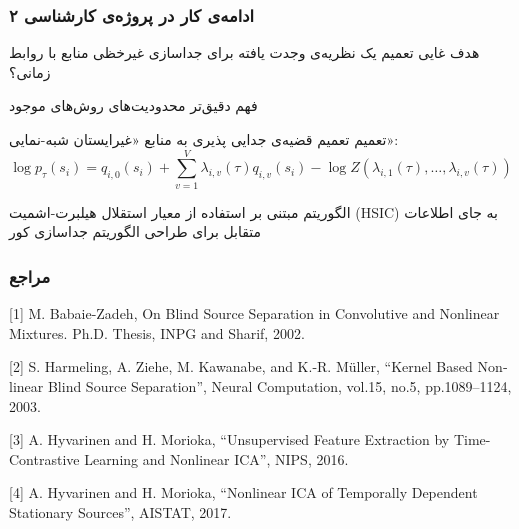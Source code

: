 \documentclass{beamer}
\begin{document}
\begin{frame}
\frametitle{
	ادامه‌ی کار در پروژه‌ی کارشناسی ۲}

{
	\begin{block}{هدف غایی}
		تعمیم 
		یک نظریه‌ی وجدت‌ یافته برای جداسازی غیرخظی منابع با روابط زمانی؟ 
		
		فهم دقیق‌تر محدودیت‌های روش‌های موجود
	\end{block} 
}

{
	\begin{block}{تعمیم 
		}
		تعمیم قضیه‌ی جدایی پذیری 
		به منابع «غیرایستان شبه-نمایی»:
		\begin{equation*} 
		\log p_\tau(s_i)=  q_{i,0}(s_i) + \sum_{v=1}^V \lambda_{i,v}(\tau) q_{i,v}(s_i) - \log Z( \lambda_{i,1}(\tau),\ldots,\lambda_{i,v}(\tau))
		\label{eq:p_tau}
		\end{equation*}
	\end{block} 
}

	\begin{block}{الگوریتم مبتنی بر 
	}
	استفاده از معیار استقلال هیلبرت-اشمیت (HSIC) به جای اطلاعات متقابل برای طراحی الگوریتم جداسازی کور
	\end{block} 

\end{frame}



\begin{frame}
\frametitle{مراجع}
\footnotesize{
\begin{flushleft}
	
\begin{latin}
[1] M. Babaie-Zadeh, On Blind Source  Separation in Convolutive and
 Nonlinear Mixtures. Ph.D. Thesis, INPG and Sharif, 2002.
\vspace{0.5cm}

[2]  S. Harmeling, A. Ziehe, M. Kawanabe, and K.-R. Müller, “Kernel Based Nonlinear Blind Source Separation”, Neural Computation,
 vol.15, no.5, pp.1089–1124, 2003.
\vspace{0.5cm}


[3] A. Hyvarinen and H. Morioka, “Unsupervised Feature Extraction
by Time-Contrastive Learning and Nonlinear ICA”, NIPS, 2016.
\vspace{0.5cm}

[4] A. Hyvarinen and H. Morioka, “Nonlinear ICA of Temporally Dependent Stationary Sources”, AISTAT, 2017.
\vspace{0.5cm}


\end{latin}

\end{flushleft}
}
\end{frame}
\end{document}
